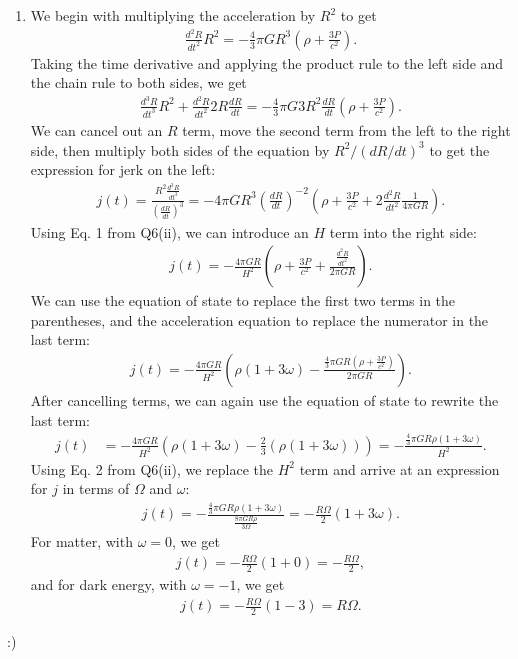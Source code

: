 \documentclass[11pt,letterpaper]{article}
\begin{document}
\begin{enumerate}[label=(\roman*)]
    \item We begin with multiplying the acceleration by $R^2$ to get 
        \begin{align*}
            \frac{d^2R}{dt^2}R^2 = -\frac{4}{3}\pi GR^3(\rho + \frac{3P}{c^2}).
        \end{align*}
        Taking the time derivative and applying the product rule to the left side and the chain rule to both sides, we get 
        \begin{align*}
            \frac{d^3R}{dt^3}R^2 + \frac{d^2R}{dt^2}2R\frac{dR}{dt} = -\frac{4}{3}\pi G3R^2\frac{dR}{dt}(\rho + \frac{3P}{c^2}).
        \end{align*}
        We can cancel out an $R$ term, move the second term from the left to the right side, then multiply both sides of the equation by $R^2/(dR/dt)^3$ to get the expression for jerk on the left:
        \begin{align*}
            j(t) = \frac{R^2\frac{d^3R}{dt^3}}{(\frac{dR}{dt})^3} = -4\pi GR^3\left(\frac{dR}{dt}\right)^{-2}\left(\rho + \frac{3P}{c^2} + 2\frac{d^2R}{dt^2}\frac{1}{4\pi GR}\right).
        \end{align*}
        Using Eq. 1 from Q6(ii), we can introduce an $H$ term into the right side:
        \begin{align*}
            j(t) = -\frac{4\pi GR}{H^2}\left(\rho + \frac{3P}{c^2} + \frac{\frac{d^2R}{dt^2}}{2\pi GR}\right).
        \end{align*}
        We can use the equation of state to replace the first two terms in the parentheses, and the acceleration equation to replace the numerator in the last term: 
        \begin{align*}
            j(t) = -\frac{4\pi GR}{H^2}\left(\rho(1+3\omega) - \frac{\frac{4}{3}\pi GR(\rho + \frac{3P}{c^2})}{2\pi GR}\right).
        \end{align*}
        After cancelling terms, we can again use the equation of state to rewrite the last term:
        \begin{align*}
            j(t) &= -\frac{4\pi GR}{H^2}\left(\rho(1+3\omega) - \frac{2}{3}(\rho(1+3\omega))\right) = -\frac{\frac{4}{3}\pi GR\rho(1+3\omega)}{H^2}.
        \end{align*}
        Using Eq. 2 from Q6(ii), we replace the $H^2$ term and arrive at an expression for $j$ in terms of $\Omega$ and $\omega$:
        \begin{align*}
            j(t) = -\frac{\frac{4}{3}\pi GR\rho(1+3\omega)}{\frac{8\pi GR\rho}{3\Omega}} = -\frac{R\Omega}{2}(1+3\omega).
        \end{align*}
        For matter, with $\omega=0$, we get 
        \begin{align*}
            j(t) = -\frac{R\Omega}{2}(1+0) = -\frac{R\Omega}{2},
        \end{align*}
        and for dark energy, with $\omega=-1$, we get 
        \begin{align*}
            j(t) = -\frac{R\Omega}{2}(1-3) = R\Omega.
        \end{align*}

\end{enumerate}

:)
\end{document}
